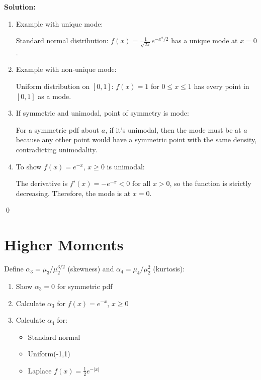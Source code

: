 \noindent\textbf{Solution:}
\begin{enumerate}[label=(\alph*)]
    \item Example with unique mode:
    
    Standard normal distribution: $f(x) = \frac{1}{\sqrt{2\pi}}e^{-x^2/2}$ has a unique mode at $x = 0$.
    
    \item Example with non-unique mode:
    
    Uniform distribution on $[0,1]$: $f(x) = 1$ for $0 \leq x \leq 1$ has every point in $[0,1]$ as a mode.
    
    \item If symmetric and unimodal, point of symmetry is mode:
    
    For a symmetric pdf about $a$, if it's unimodal, then the mode must be at $a$ because any other point would have a symmetric point with the same density, contradicting unimodality.
    
    \item To show $f(x)=e^{-x}$, $x\geq0$ is unimodal:
    
    The derivative is $f'(x) = -e^{-x} < 0$ for all $x > 0$, so the function is strictly decreasing. Therefore, the mode is at $x = 0$.
\end{enumerate}


\qed
\section{Higher Moments}

\begin{problembox}
Define $\alpha_3=\mu_3/\mu_2^{3/2}$ (skewness) and $\alpha_4=\mu_4/\mu_2^2$ (kurtosis):
\begin{enumerate}[label=(\alph*)]
    \item Show $\alpha_3=0$ for symmetric pdf
    \item Calculate $\alpha_3$ for $f(x)=e^{-x}$, $x\geq0$
    \item Calculate $\alpha_4$ for:
    \begin{itemize}
        \item Standard normal
        \item Uniform(-1,1)
        \item Laplace $f(x)=\frac{1}{2}e^{-|x|}$
    \end{itemize}
\end{enumerate}
\end{problembox}

